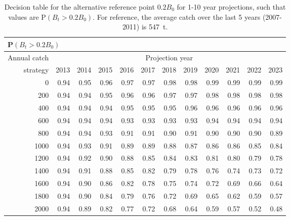 \begin{table}[tbp]
\begin{center}
\caption{Decision table for the alternative reference point $0.2 B_0$ for 1-10 year projections, such that values are P$(B_t > 0.2 B_0)$. For reference, the average catch over the last 5 years (2007-2011) is 547~t.}
\label{tab:B00.2.10yr}
\begin{tabular}{rrrrrrrrrrrr}
\multicolumn{12}{l}{P$(B_t > 0.2 B_0)$} \\
\hline
Annual catch & \multicolumn{11}{c}{Projection year} \\
\cline{2-12}
strategy & 2013 & 2014 & 2015 & 2016 & 2017 & 2018 & 2019 & 2020 & 2021 & 2022 & 2023 \\ 
  \hline
0 & 0.94 & 0.95 & 0.96 & 0.97 & 0.97 & 0.98 & 0.98 & 0.99 & 0.99 & 0.99 & 0.99 \\ 
  200 & 0.94 & 0.94 & 0.95 & 0.96 & 0.96 & 0.97 & 0.97 & 0.98 & 0.98 & 0.98 & 0.98 \\ 
  400 & 0.94 & 0.94 & 0.94 & 0.95 & 0.95 & 0.95 & 0.96 & 0.96 & 0.96 & 0.96 & 0.96 \\ 
  600 & 0.94 & 0.94 & 0.94 & 0.93 & 0.93 & 0.93 & 0.93 & 0.94 & 0.94 & 0.94 & 0.94 \\ 
  800 & 0.94 & 0.94 & 0.93 & 0.91 & 0.91 & 0.90 & 0.91 & 0.90 & 0.90 & 0.90 & 0.89 \\ 
  1000 & 0.94 & 0.93 & 0.91 & 0.89 & 0.89 & 0.88 & 0.87 & 0.86 & 0.86 & 0.85 & 0.84 \\ 
  1200 & 0.94 & 0.92 & 0.90 & 0.88 & 0.85 & 0.84 & 0.83 & 0.81 & 0.80 & 0.79 & 0.78 \\ 
  1400 & 0.94 & 0.91 & 0.88 & 0.85 & 0.82 & 0.79 & 0.78 & 0.76 & 0.74 & 0.73 & 0.72 \\ 
  1600 & 0.94 & 0.90 & 0.86 & 0.82 & 0.78 & 0.75 & 0.74 & 0.72 & 0.69 & 0.66 & 0.64 \\ 
  1800 & 0.94 & 0.90 & 0.84 & 0.79 & 0.76 & 0.72 & 0.69 & 0.65 & 0.62 & 0.59 & 0.57 \\ 
  2000 & 0.94 & 0.89 & 0.82 & 0.77 & 0.72 & 0.68 & 0.64 & 0.59 & 0.57 & 0.52 & 0.48 \\ 
   \hline
\end{tabular}
\end{center}
\end{table}%
